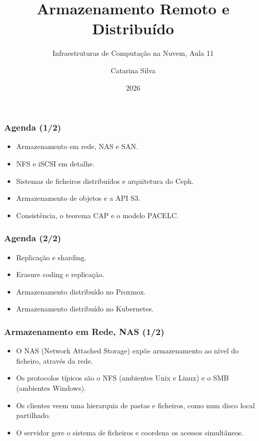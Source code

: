\documentclass[aspectratio=169]{beamer}
\title{Armazenamento Remoto e Distribuído}
\subtitle{Infraestruturas de Computação na Nuvem, Aula 11}
\author{Catarina Silva}
\institute{ESTGA, Universidade de Aveiro}
\date{2026}
\begin{document}
\begin{frame}[plain]
  \titlepage
\end{frame}

\begin{frame}
\frametitle{Agenda \textcolor{NudeTaupe}{\small(1/2)}}
\begin{itemize}
    \setlength\itemsep{0.4cm}
    \item Armazenamento em rede, NAS e SAN.
    \item NFS e iSCSI em detalhe.
    \item Sistemas de ficheiros distribuídos e arquitetura do Ceph.
    \item Armazenamento de objetos e a API S3.
    \item Consistência, o teorema CAP e o modelo PACELC.
\end{itemize}
\end{frame}

\begin{frame}
\frametitle{Agenda \textcolor{NudeTaupe}{\small(2/2)}}
\begin{itemize}
    \setlength\itemsep{0.4cm}
    \item Replicação e sharding.
    \item Erasure coding e replicação.
    \item Armazenamento distribuído no Proxmox.
    \item Armazenamento distribuído no Kubernetes.
\end{itemize}
\end{frame}

\begin{frame}
\frametitle{Armazenamento em Rede, NAS \textcolor{NudeTaupe}{\small(1/2)}}
\begin{itemize}
    \setlength\itemsep{0.4cm}
    \item O NAS (Network Attached Storage) expõe armazenamento ao nível do ficheiro, através da rede.
    \item Os protocolos típicos são o NFS (ambientes Unix e Linux) e o SMB (ambientes Windows).
    \item Os clientes veem uma hierarquia de pastas e ficheiros, como num disco local partilhado.
    \item O servidor gere o sistema de ficheiros e coordena os acessos simultâneos.
\end{itemize}
\end{frame}
\end{document}
